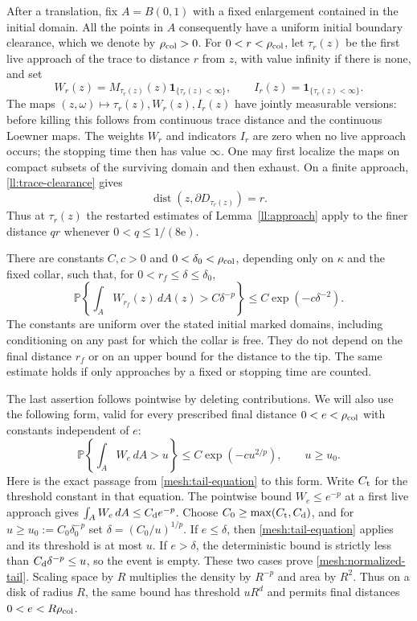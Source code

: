 After a translation, fix $A=B(0,1)$ with a fixed enlargement contained in
the initial domain.  All the points in $A$ consequently have a uniform
initial boundary clearance, which we denote by $\rho_{\rm col}>0$.
For $0<r<\rho_{\rm col}$, let
$\tau_r(z)$ be the first live approach of the trace to distance $r$
from $z$, with value infinity if there is none, and set
\[
 W_r(z)=M_{\tau_r(z)}(z)\mathbf1_{\{\tau_r(z)<\infty\}},
 \qquad I_r(z)=\mathbf1_{\{\tau_r(z)<\infty\}}.
\]
The maps $(z,\omega)\mapsto\tau_r(z),W_r(z),I_r(z)$ have jointly
measurable versions: before killing this follows from continuous trace
distance and the continuous Loewner maps. The weights $W_r$ and
indicators $I_r$ are zero when no live approach occurs; the stopping
time then has value $\infty$.  One may first localize the maps on
compact subsets of the surviving domain and then exhaust.
On a finite approach, \eqref{ll:trace-clearance} gives
\[
 \operatorname{dist}(z,\partial D_{\tau_r(z)})=r.
\]
Thus at $\tau_r(z)$ the restarted estimates of Lemma~\ref{ll:approach}
apply to the finer distance $qr$ whenever $0<q\le1/(8\mathrm e)$.

\begin{proposition}\label{mesh:tail}
There are constants $C,c>0$ and $0<\delta_0<\rho_{\rm col}$, depending only on $\kappa$ and
the fixed collar, such that, for $0<r_f\le\delta\le\delta_0$,
\begin{equation}
 \mathbb P\left\{\int_A W_{r_f}(z)\,dA(z)>C\delta^{-p}\right\}
 \le C\exp(-c\delta^{-2}).
 \label{mesh:tail-equation}
\end{equation}
The constants are uniform over the stated initial marked domains, including
conditioning on any past for which the collar is free.  They do not
depend on the final distance $r_f$ or on an upper bound for the
distance to the tip.  The same estimate holds if only approaches by a
fixed or stopping time are counted.
\end{proposition}

The last assertion follows pointwise by deleting contributions.  We
will also use the following form, valid for every prescribed final
distance $0<e<\rho_{\rm col}$ with constants independent of $e$:
\begin{equation}
 \mathbb P\left\{\int_AW_e\,dA>u\right\}
       \le C\exp(-cu^{2/p}),\qquad u\ge u_0.
 \label{mesh:normalized-tail}
\end{equation}
Here is the exact passage from \eqref{mesh:tail-equation} to this
form.  Write $C_{\rm t}$ for the threshold constant in that equation.
The pointwise bound $W_e\le e^{-p}$ at a first live approach gives
$\int_AW_e\,dA\le C_{\rm d}e^{-p}$.  Choose
$C_0\ge\max(C_{\rm t},C_{\rm d})$, and for
$u\ge u_0:=C_0\delta_0^{-p}$ set
$\delta=(C_0/u)^{1/p}$.  If $e\le\delta$, then
\eqref{mesh:tail-equation} applies and its threshold is at most $u$.
If $e>\delta$, the deterministic bound is strictly less than
$C_{\rm d}\delta^{-p}\le u$, so the event is empty.  These two cases
prove \eqref{mesh:normalized-tail}.  Scaling space by $R$ multiplies
the density by $R^{-p}$ and area by $R^2$.  Thus on a disk of radius
$R$, the same bound has threshold $uR^d$ and permits final distances
$0<e<R\rho_{\rm col}$.

